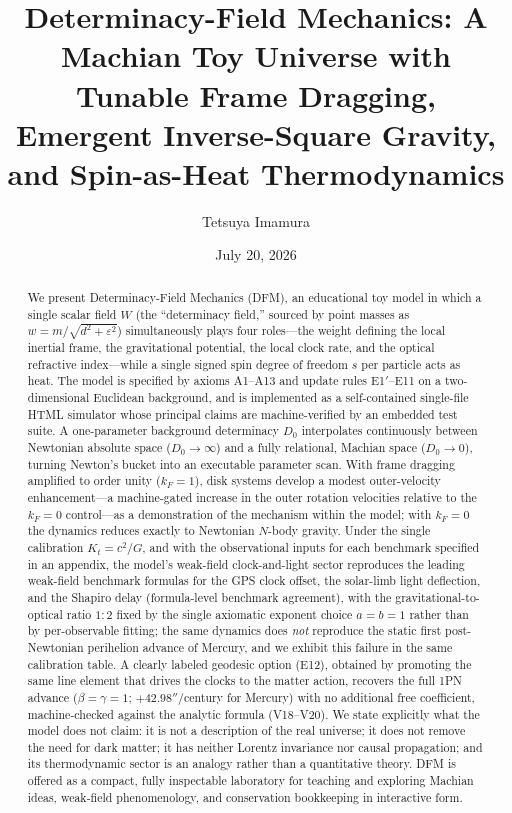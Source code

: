\documentclass[aps,reprint,amsmath,amssymb,nofootinbib,superscriptaddress,floatfix]{revtex4-2}
\newcommand{\Kt}{K_t}
\newcommand{\Dz}{D_0}
\begin{document}
\title{Determinacy-Field Mechanics: A Machian Toy Universe with Tunable
Frame Dragging, Emergent Inverse-Square Gravity, and Spin-as-Heat
Thermodynamics}

\author{Tetsuya Imamura}

\date{July 20, 2026}

\begin{abstract}
We present Determinacy-Field Mechanics (DFM), an educational toy model in
which a single scalar field $W$ (the ``determinacy field,'' sourced by
point masses as $w = m/\sqrt{d^2+\varepsilon^2}$) simultaneously plays
four roles---the weight defining the local inertial frame, the
gravitational potential, the local clock rate, and the optical
refractive index---while a single signed spin degree of freedom $s$ per
particle acts as heat.
The model is specified by axioms A1--A13 and update rules E1$'$--E11 on a
two-dimensional Euclidean background, and is implemented as a
self-contained single-file HTML simulator whose principal claims are
machine-verified by an embedded test suite.
A one-parameter background determinacy $\Dz$ interpolates continuously
between Newtonian absolute space ($\Dz \to \infty$) and a fully
relational, Machian space ($\Dz \to 0$), turning Newton's bucket into
an executable parameter scan.
With frame dragging amplified to order unity ($k_F = 1$), disk systems
develop a modest outer-velocity enhancement---a machine-gated increase
in the outer rotation velocities relative to the $k_F = 0$ control---as
a demonstration of the mechanism within the model; with $k_F = 0$ the
dynamics reduces exactly to Newtonian $N$-body gravity.
Under the single calibration $\Kt = c^2/G$, and with the observational
inputs for each benchmark specified in an appendix, the model's
weak-field clock-and-light sector reproduces the leading weak-field
benchmark formulas for the GPS clock offset, the solar-limb light
deflection, and
the Shapiro delay (formula-level benchmark agreement), with the
gravitational-to-optical ratio $1{:}2$ fixed by the single axiomatic
exponent choice $a = b = 1$ rather than by per-observable fitting; the
same dynamics does \emph{not} reproduce the static first
post-Newtonian perihelion advance of Mercury, and we exhibit this
failure in the same calibration table.
A clearly labeled geodesic option (E12), obtained by promoting the
same line element that drives the clocks to the matter action,
recovers the full 1PN advance ($\beta = \gamma = 1$; $+42.98''$/century
for Mercury) with no additional free coefficient, machine-checked
against the analytic formula (V18--V20).
We state explicitly what the model does not claim: it is not a
description of the real universe; it does not remove the need for dark
matter; it has neither Lorentz invariance nor causal propagation; and
its thermodynamic sector is an analogy rather than a quantitative
theory.
DFM is offered as a compact, fully inspectable laboratory for teaching
and exploring Machian ideas, weak-field phenomenology, and conservation
bookkeeping in interactive form.
\end{abstract}
\end{document}
